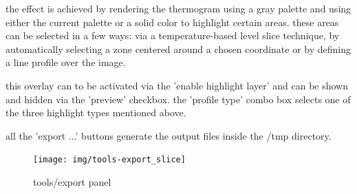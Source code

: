 \documentclass[12pt,twoside,a4paper,titlepage]{report}
\begin{document}
the effect is achieved by rendering the thermogram using a gray palette and using either the current palette or a solid color to highlight certain areas. these areas can be selected in a few ways: via a temperature-based level slice technique, by automatically selecting a zone centered around a chosen coordinate or by defining a line profile over the image.

this overlay can to be activated via the 'enable highlight layer' and can be shown and hidden via the 'preview' checkbox. the 'profile type' combo box selects one of the three highlight types mentioned above.

all the 'export ...' buttons generate the output files inside the /tmp directory.

\begin{figure}[ht]
 \centering
 \texttt{[image: img/tools-export\_slice]}
 \caption{tools/export panel}
 \label{fig:tools-export-overview}
\end{figure}
\end{document}
